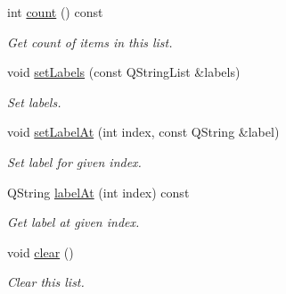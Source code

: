\begin{DoxyCompactItemize}
\item 
int \hyperlink{class_mdt_1_1_item_model_1_1_header_proxy_model_item_list_a3c794a9573588cbbdb7f91c7433ceaab}{count} () const \hypertarget{class_mdt_1_1_item_model_1_1_header_proxy_model_item_list_a3c794a9573588cbbdb7f91c7433ceaab}{}\label{class_mdt_1_1_item_model_1_1_header_proxy_model_item_list_a3c794a9573588cbbdb7f91c7433ceaab}

\begin{DoxyCompactList}\small\item\em Get count of items in this list. \end{DoxyCompactList}\item 
void \hyperlink{class_mdt_1_1_item_model_1_1_header_proxy_model_item_list_a38d9e0a5c8501dfd329a4e58ff77ea30}{set\+Labels} (const Q\+String\+List \&labels)
\begin{DoxyCompactList}\small\item\em Set labels. \end{DoxyCompactList}\item 
void \hyperlink{class_mdt_1_1_item_model_1_1_header_proxy_model_item_list_a253b41918cedc987c116521496500d6e}{set\+Label\+At} (int index, const Q\+String \&label)
\begin{DoxyCompactList}\small\item\em Set label for given index. \end{DoxyCompactList}\item 
Q\+String \hyperlink{class_mdt_1_1_item_model_1_1_header_proxy_model_item_list_a5bf80e6ab895c35e4168c2c86d3ad0b5}{label\+At} (int index) const 
\begin{DoxyCompactList}\small\item\em Get label at given index. \end{DoxyCompactList}\item 
void \hyperlink{class_mdt_1_1_item_model_1_1_header_proxy_model_item_list_ac9acab5be032a19ff728f2899f4a4911}{clear} ()\hypertarget{class_mdt_1_1_item_model_1_1_header_proxy_model_item_list_ac9acab5be032a19ff728f2899f4a4911}{}\label{class_mdt_1_1_item_model_1_1_header_proxy_model_item_list_ac9acab5be032a19ff728f2899f4a4911}

\begin{DoxyCompactList}\small\item\em Clear this list. \end{DoxyCompactList}\end{DoxyCompactItemize}


